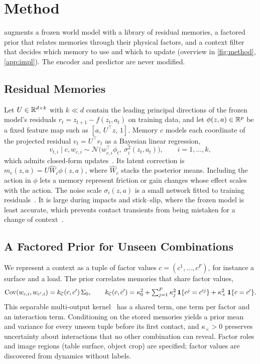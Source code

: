 \section{Method}\label{sec:method}

\method augments a frozen world model with a library of residual memories, a factored prior that relates memories through their physical factors, and a context filter that decides which memory to use and which to update (overview in \cref{fig:method}, \cref{app:impl}). The encoder and predictor are never modified.

\subsection{Residual Memories}
Let $U\in\mathbb{R}^{d\times k}$ with $k\ll d$ contain the leading principal directions of the frozen model's residuals $r_t=z_{t+1}-f(z_t,a_t)$ on training data, and let $\phi(z,a)\in\mathbb{R}^p$ be a fixed feature map such as $[a,\,U^\top z,\,1]$. Memory $c$ models each coordinate of the projected residual $v_t=U^\top r_t$ as a Bayesian linear regression,
\begin{equation}\label{eq:adapter}
  v_{t,i}\mid c,w_{c,i}\sim\mathcal N\big(w_{c,i}^\top\phi_t,\ \sigma_i^2(z_t,a_t)\big),\qquad i=1,\dots,k,
\end{equation}
which admits closed-form updates~\citep{harrison2018alpaca}. Its latent correction is $m_c(z,a)=U\widehat W_c\phi(z,a)$, where $\widehat W_c$ stacks the posterior means. Including the action in $\phi$ lets a memory represent friction or gain changes whose effect scales with the action. The noise scale $\sigma_i(z,a)$ is a small network fitted to training residuals~\citep{kersting2007hetgp}. It is large during impacts and stick--slip, where the frozen model is least accurate, which prevents contact transients from being mistaken for a change of context~\citep{bauza2017probpush}.

\subsection{A Factored Prior for Unseen Combinations}
We represent a context as a tuple of factor values $c=(c^1,\dots,c^F)$, for instance a surface and a load. The prior correlates memories that share factor values,
\begin{equation}\label{eq:kernel}
  \operatorname{Cov}(w_{c,i},w_{c',i})=k_{\mathcal C}(c,c')\,\Sigma_0,\qquad
  k_{\mathcal C}(c,c')=\kappa_0^2+\textstyle\sum_{j=1}^{F}\kappa_j^2\,\mathbf{1}\{c^j=c'^j\}+\kappa_\times^2\,\mathbf{1}\{c=c'\}.
\end{equation}
This separable multi-output kernel~\citep{alvarez2012kernels} has a shared term, one term per factor and an interaction term. Conditioning on the stored memories yields a prior mean and variance for every unseen tuple before its first contact, and $\kappa_\times>0$ preserves uncertainty about interactions that no other combination can reveal. Factor roles and image regions (table surface, object crop) are specified; factor values are discovered from dynamics without labels.

